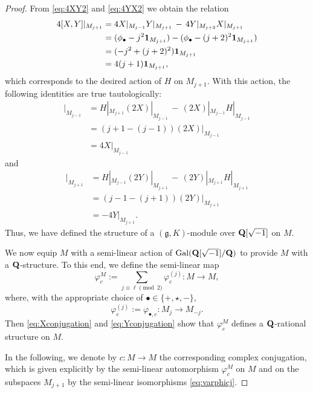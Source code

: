\documentclass[a4paper,12pt,reqno]{amsart}
\newcommand{\QQ}{{\rm\bf Q}}
\DeclareMathOperator{\Gal}{\mathrm {Gal}}
\theoremstyle{plain}
\theoremstyle{remark}
\begin{document}
\begin{proof}
    From \eqref{eq:4XY2} and \eqref{eq:4YX2} we obtain the relation
    \begin{align*}
      4[X,Y]|_{M_{j+1}}
      &=4X|_{M_{j-1}}Y|_{M_{j+1}}\,-\,4Y|_{M_{j+3}}X|_{M_{j+1}}\\
      &=(\phi_\bullet-j^2{\bf1}_{M_{j+1}})-(\phi_\bullet-(j+2)^2{\bf1}_{M_{j+1}})\\
      &=(-j^2+(j+2)^2){\bf1}_{M_{j+1}}\\
      &=4(j+1){\bf1}_{M_{j+1}},
    \end{align*}
    which corresponds to the desired action of $H$ on $M_{j+1}$. With this action, the following identities are true tautologically:
    \begin{align*}
      [H,2X]|_{M_{j-1}}&=H|_{M_{j+1}}(2X)|_{M_{j-1}}\,-\,(2X)|_{M_{j-1}}H|_{M_{j-1}}\\
      &=(j+1-(j-1))(2X)|_{M_{j-1}}\\
      &=4X|_{M_{j-1}}
    \end{align*}
    and
    \begin{align*}
      [H,2Y]|_{M_{j+1}}&=H|_{M_{j-1}}(2Y)|_{M_{j+1}}\,-\,(2Y)|_{M_{j+1}}H|_{M_{j+1}}\\
      &=(j-1-(j+1))(2Y)|_{M_{j+1}}\\
      &=-4Y|_{M_{j+1}}.
    \end{align*}
    Thus, we have defined the structure of a $(\mathfrak{g}, K)$-module over $\QQ[\sqrt{-1}]$ on $M$.

    \smallskip
    We now equip $M$ with a semi-linear action of $\Gal(\QQ[\sqrt{-1}]/\QQ)$ to provide $M$ with a $\QQ$-structure. To this end, we define the semi-linear map
    \[
    \varphi_c^M:=\sum_{j\equiv\ell\pmod{2}}\varphi_{c}^{(j)}\colon M\to M,
    \]
    where, with the appropriate choice of $\bullet\in\{+,\star,-\}$,
    \begin{equation}
      \varphi_c^{(j)}:=\varphi_{\bullet,c}\colon M_{j}\to M_{-j}.
      \label{eq:varphicj}
    \end{equation}
    Then \eqref{eq:Xconjugation} and \eqref{eq:Yconjugation} show that $\varphi_c^M$ defines a $\QQ$-rational structure on $M$.

    In the following, we denote by $c \colon M \to M$ the corresponding complex conjugation, which is given explicitly by the semi-linear automorphism $\varphi_c^M$ on $M$ and on the subspaces $M_{j+1}$ by the semi-linear isomorphisms \eqref{eq:varphicj}.


\end{proof}
\end{document}
